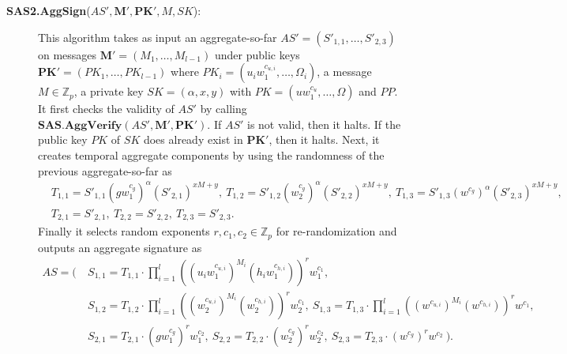 \documentclass[11pt,letterpaper]{article}
\newcommand{\vect}[1]{\mathbf{#1}}
\newcommand{\Z}{\mathbb{Z}}
\newcommand{\tb}[1]{\textbf{#1}}
\begin{document}
\begin{description}
\item [\tb{SAS2.AggSign}($AS', \vect{M}', \vect{PK}', M, SK$):] This
    algorithm takes as input an aggregate-so-far $AS' = (S'_{1,1}, \ldots,
    S'_{2,3})$ on messages $\vect{M}' = (M_1, \ldots, M_{l-1})$ under
    public keys $\vect{PK}' = (PK_1, \ldots, PK_{l-1})$ where $PK_i = (u_i
    w_1^{c_{u,i}}, \ldots, \Omega_i)$, a message $M \in \Z_p$, a private
    key $SK = (\alpha, x, y)$ with $PK = (u w_1^{c_u}, \ldots, \Omega)$ and
    $PP$. It first checks the validity of $AS'$ by calling
    $\tb{SAS.AggVerify}(AS', \vect{M}', \vect{PK}')$. If $AS'$ is not
    valid, then it halts. If the public key $PK$ of $SK$ does already exist
    in $\vect{PK}'$, then it halts. Next, it creates temporal aggregate
    components by using the randomness of the previous aggregate-so-far as
    \begin{align*}
    &   T_{1,1} = S'_{1,1} (g w_1^{c_g})^{\alpha} (S'_{2,1})^{xM + y},~
        T_{1,2} = S'_{1,2} (w_2^{c_g})^{\alpha} (S'_{2,2})^{xM + y},~
        T_{1,3} = S'_{1,3} (w^{c_g})^{\alpha} (S'_{2,3})^{xM + y},~ \\
    &   T_{2,1} = S'_{2,1},~
        T_{2,2} = S'_{2,2},~
        T_{2,3} = S'_{2,3}.
    \end{align*}
    Finally it selects random exponents $r, c_1, c_2 \in \Z_p$ for
    re-randomization and outputs an aggregate signature as
    \begin{align*}
    AS = \Big(~
    &   S_{1,1} = T_{1,1} \cdot \prod_{i=1}^{l}
                  ((u_i w_1^{c_{u,i}})^{M_i} (h_i w_1^{c_{h,i}}))^r w_1^{c_1},~ \\
    &   S_{1,2} = T_{1,2} \cdot \prod_{i=1}^{l}
                  ((w_2^{c_{u,i}})^{M_i} (w_2^{c_{h,i}}))^r w_2^{c_1},~
        S_{1,3} = T_{1,3} \cdot \prod_{i=1}^{l}
                  ((w^{c_{u,i}})^{M_i} (w^{c_{h,i}}))^r w^{c_1},~ \\
    &   S_{2,1} = T_{2,1} \cdot (g w_1^{c_g})^r w_1^{c_2},~
        S_{2,2} = T_{2,2} \cdot (w_2^{c_g})^r w_2^{c_2},~
        S_{2,3} = T_{2,3} \cdot (w^{c_g})^r w^{c_2}
    ~\Big).
    \end{align*}


\end{description}
\end{document}
